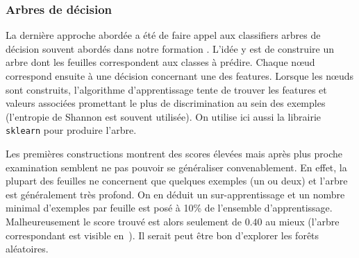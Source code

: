 \documentclass[../main.tex]{subfiles}
\begin{document}
\subsubsection{Arbres de décision}

La dernière approche abordée a été de faire appel aux classifiers arbres de décision souvent abordés dans notre formation \cite{dt}. L'idée y est de construire un arbre dont les feuilles correspondent aux classes à prédire. Chaque nœud correspond ensuite à une décision concernant une des features. Lorsque les nœuds sont construits, l'algorithme d'apprentissage tente de trouver les features et valeurs associées promettant le plus de discrimination au sein des exemples (l'entropie de Shannon est souvent utilisée). On utilise ici aussi la librairie \texttt{sklearn} pour produire l'arbre.

Les premières constructions montrent des scores élevées mais après plus proche examination semblent ne pas pouvoir se généraliser convenablement. En effet, la plupart des feuilles ne concernent que quelques exemples (un ou deux) et l'arbre est généralement très profond. On en déduit un sur-apprentissage et un nombre minimal d'exemples par feuille est posé à 10\% de l'ensemble d'apprentissage. Malheureusement le score trouvé est alors seulement de $0.40$ au mieux (l'arbre correspondant est visible en~). Il serait peut être bon d'explorer les forêts aléatoires.
\end{document}
